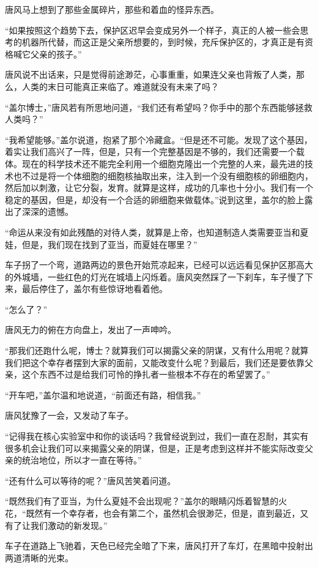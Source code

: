 唐风马上想到了那些金属碎片，那些和着血的怪异东西。

“如果按照这个趋势下去，保护区迟早会变成另外一个样子，真正的人被一些会思考的机器所代替，而这正是父亲所想要的，到时候，充斥保护区的，才真正是有资格喊它父亲的孩子。”

唐风说不出话来，只是觉得前途渺茫，心事重重，如果连父亲也背叛了人类，那么，人类的末日可能真正来临了。难道就没有未来了吗？

“盖尔博士，”唐风若有所思地问道，“我们还有希望吗？你手中的那个东西能够拯救人类吗？”

“我希望能够。”盖尔说道，抱紧了那个冷藏盒。“但是还不可能。发现了这个基因，着实让我们高兴了一阵，但是，只有一个完整基因是不够的，我们还需要一个载体。现在的科学技术还不能完全利用一个细胞克隆出一个完整的人来，最先进的技术也不过是将一个体细胞的细胞核抽取出来，注入到一个没有细胞核的卵细胞内，然后加以刺激，让它分裂，发育。就算是这样，成功的几率也十分小。我们有一个稳定的基因，但是，却没有一个合适的卵细胞来做载体。”说到这里，盖尔的脸上露出了深深的遗憾。

“命运从来没有如此残酷的对待人类，就算是上帝，也知道制造人类需要亚当和夏娃，但是，我们现在找到了亚当，而夏娃在哪里？”

车子拐了一个弯，道路两边的景色开始荒凉起来，已经可以远远看见保护区那高大的外城墙，一些红色的灯光在城墙上闪烁着。唐风突然踩了一下刹车，车子慢了下来，最后停住了，盖尔有些惊讶地看着他。

“怎么了？”

唐风无力的俯在方向盘上，发出了一声呻吟。

“那我们还跑什么呢，博士？就算我们可以揭露父亲的阴谋，又有什么用呢？就算我们把这个幸存者摆到大家的面前，又能改变什么呢？到最后，我们还是要依靠父亲，这个东西不过是给我们可怜的挣扎者一些根本不存在的希望罢了。”

“开车吧，”盖尔温和地说道，“前面还有路，相信我。”

唐风犹豫了一会，又发动了车子。

“记得我在核心实验室中和你的谈话吗？我曾经说到过，我们一直在忍耐，其实有很多机会让我们可以来揭露父亲的阴谋，但是，正是考虑到这样并不能实际改变父亲的统治地位，所以才一直在等待。”

“还有什么可以等待的呢？”唐风苦笑着问道。

“既然我们有了亚当，为什么夏娃不会出现呢？”盖尔的眼睛闪烁着智慧的火花，“既然有一个幸存者，也会有第二个，虽然机会很渺茫，但是，直到最近，又有了让我们激动的新发现。”

车子在道路上飞驰着，天色已经完全暗了下来，唐风打开了车灯，在黑暗中投射出两道清晰的光束。

